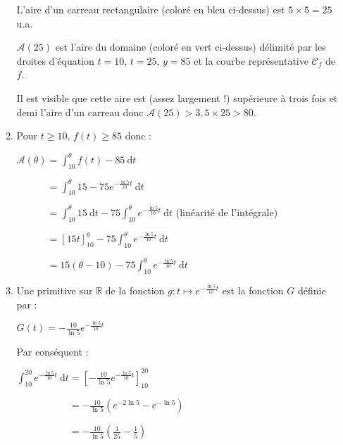 \begin{corrige}
\begin{enumerate}
\begin{enumerate}
               L'aire d'un carreau rectangulaire (coloré en bleu ci-dessus) est $5 \times 5 = 25$ u.a.
               \par
               $\mathcal{A}(25)$ est l'aire du domaine (coloré en vert ci-dessus) délimité par les droites d'équation $t = 10$, $t = 25$, $y = 85$ et la courbe représentative $\mathscr{C}_f$ de $f$.
               \par
               Il est visible que cette aire est (assez largement !) supérieure à trois fois et demi l'aire d'un carreau donc $\mathcal{A}(25)  > 3,5 \times 25  >  80$.
               \item
               Pour $t \geqslant 10$, $f(t) \geqslant 85$ donc :
               \par
               $\mathcal{A}(\theta) = \int_{10}^{\theta} f(t)-85\:\text{d}t$
               \par
               $\phantom{\mathcal{A}(\theta)} = \int_{10}^{\theta} 15-75{e}^{- \frac{\ln 5}{10}t}\:\text{d}t$
               \par
               $\phantom{\mathcal{A}(\theta)} = \int_{10}^{\theta} 15\:\text{d}t-75\int_{10}^{\theta}{e}^{-\frac{\ln 5}{10}t}\:\text{d}t$ (linéarité de l'intégrale)
               \par
               $\phantom{\mathcal{A}(\theta)} = \left[15t\right]_{10}^\theta-75\int_{10}^{\theta}{e}^{-\frac{\ln 5}{10}t}\:\text{d}t$
               \par
               $\phantom{\mathcal{A}(\theta)} = 15(\theta-10)-75\int_{10}^{\theta}{e}^{-\frac{\ln 5}{10}t}\:\text{d}t$
               \item
               Une primitive sur $\mathbb{R}$ de la fonction $g : t \longmapsto {e}^{-\frac{\ln 5}{10}t}$ est la fonction $G $ définie par :
               \par
               $G(t)=-\frac{10}{\ln 5}{e}^{-\frac{\ln 5}{10}t}$
               \par
               Par conséquent :
               \par
               $\int_{10}^{20}{e}^{-\frac{\ln 5}{10}t}\:\text{d}t = \left[-\frac{10}{\ln 5}{e}^{-\frac{\ln 5}{10}t}\right]_{10}^{20}$
               \par
               $\phantom{\int_{10}^{20}{e}^{-\frac{\ln 5}{10}t}\:\text{d}t} = -\frac{10}{\ln 5}\left({e}^{-2\ln 5}-{e}^{-\ln 5}\right) $
               \par
               $\phantom{\int_{10}^{20}{e}^{-\frac{\ln 5}{10}t}\:\text{d}t} = -\frac{10}{\ln 5}\left(\frac{1}{25}-\frac{1}{5}\right) $

\end{enumerate}
\end{enumerate}
\end{corrige}
